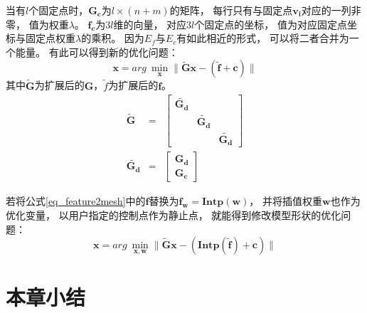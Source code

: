 当有$l$个固定点时，$\bm{G_c}$为$l \times (n+m)$的矩阵，
每行只有与固定点$\bm{v_i}$对应的一列非零，
值为权重$\lambda$。
$\bm{f_c}$为$3l$维的向量，
对应$3l$个固定点的坐标，
值为对应固定点坐标与固定点权重$\lambda$的乘积。
因为$E_f$与$E_c$有如此相近的形式，
可以将二者合并为一个能量。
有此可以得到新的优化问题：
\begin{equation}
    \label{eq_feature2mesh}
    \bm{x}=arg\ \min_{\bm{x}} \| \bm{\widetilde{G}x}-(\widetilde{\bm{f}}+\bm{c}) \|
\end{equation}
其中$\bm{\widetilde{G}}$为扩展后的$\bm{G}$，$\widetilde{f}$为扩展后的$\bm{f}$。
\begin{eqnarray}
    \bm{\widetilde{G}}&=&
    \begin{bmatrix}
        \bm{\widetilde{G_d}} &        & \\ 
         &       \bm{\widetilde{G_d}} & \\ 
         &       &                  \bm{\widetilde{G_d}}
    \end{bmatrix}\\
    \bm{\widetilde{G_d}}&=&
    \begin{bmatrix}
        \bm{G_d} \\ 
        \bm{G_c}
    \end{bmatrix}
\end{eqnarray}

若将公式\ref{eq_feature2mesh}中的$\bm{f}$替换为$\bm{f_w}=\bm{Intp}(\bm{w})$，
并将插值权重$\bm{w}$也作为优化变量，
以用户指定的控制点作为静止点，
就能得到修改模型形状的优化问题：
\begin{equation}
    \bm{x}=arg\ \min_{\bm{x},\bm{w}}
    \|
        \bm{\widetilde{G}x}
        -
        (\bm{Intp}(\widetilde{\bm{f}})+\bm{c}) 
    \|
\end{equation}
\section{本章小结}